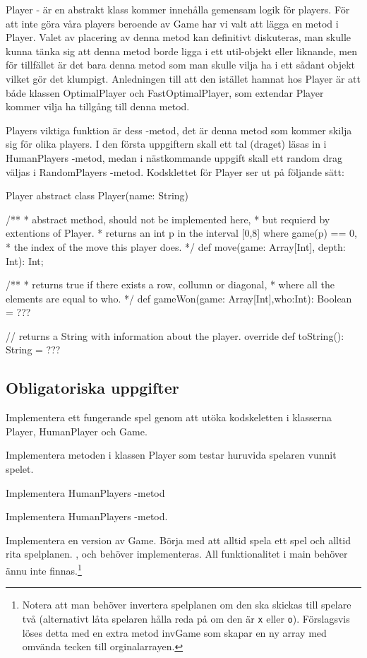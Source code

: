 Player - är en abstrakt klass kommer innehålla gemensam logik för players. För att inte göra våra players beroende av Game har vi valt att lägga en metod  i Player. Valet av placering av denna metod kan definitivt diskuteras, man skulle kunna tänka sig att denna metod borde ligga i ett util-objekt eller liknande, men för tillfället är det bara denna metod som man skulle vilja ha i ett sådant objekt vilket gör det klumpigt. Anledningen till att den istället hamnat hos Player är att både klassen OptimalPlayer och FastOptimalPlayer, som extendar Player kommer vilja ha tillgång till denna metod.

Players viktiga funktion är dess -metod, det är denna metod som kommer skilja sig för olika players. I den första uppgiftern skall ett tal (draget) läsas in i HumanPlayers -metod, medan i nästkommande uppgift skall ett random drag väljas i RandomPlayers -metod.
Kodsklettet för Player ser ut på följande sätt:
\begin{ScalaSpec}{Player}
abstract class Player(name: String) {
	
	/**
	 * abstract method, should not be implemented here, 
	 * but requierd by extentions of Player.
	 * returns an int p in the interval [0,8] where game(p) == 0,
	 * the index of the move this player does. 
	 */
	def move(game: Array[Int], depth: Int): Int;
	
	/**
	 * returns true if there exists a row, collumn or diagonal,
	 * where all the elements are equal to who.
	 */
	def gameWon(game: Array[Int],who:Int): Boolean =  ???
	
	// returns a String with information about the player.
	override def toString(): String = ???
}
\end{ScalaSpec}

 
\subsection{Obligatoriska uppgifter}

\Task Implementera ett fungerande spel genom att utöka kodskeletten i klasserna Player, HumanPlayer och Game.

\Subtask Implementera metoden  i klassen Player som testar huruvida spelaren  vunnit spelet.

\Subtask Implementera HumanPlayers -metod

\Subtask Implementera HumanPlayers -metod.

\Subtask Implementera en version av Game. Börja med att alltid spela ett spel och alltid rita spelplanen. ,  och  behöver implementeras. All funktionalitet i main behöver ännu inte finnas.\footnote{Notera att man behöver invertera spelplanen om den ska skickas till spelare två (alternativt låta spelaren hålla reda på om den är \texttt{x} eller \texttt{o}). Förslagsvis löses detta med en extra metod invGame som skapar en ny array med omvända tecken till orginalarrayen.}

